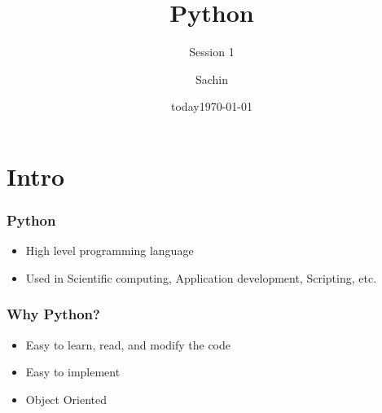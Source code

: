 \documentclass[bigger, presentation]{beamer}
\date{today}
\subtitle{Session 1}
\title{Python}
\author{Sachin}
\date{\today}
\begin{document}
\maketitle

\section{Intro}
\label{sec-1}
\begin{frame}
\frametitle{Python}
\label{sec-1-1}


\begin{itemize}
\item High level programming language
\item Used in Scientific computing, Application development, Scripting,
     etc.
\end{itemize}
\end{frame}
\begin{frame}
\frametitle{Why Python?}
\label{sec-1-2}


\begin{itemize}
\item Easy to learn, read, and modify the code
\item Easy to implement
\item Object Oriented
\end{itemize}
\end{frame}
\end{document}
